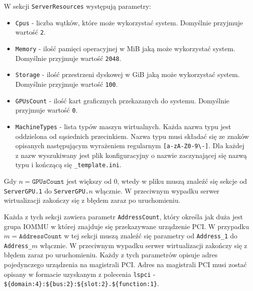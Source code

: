 \documentclass[../opis-rozwiazania.tex]{subfiles}
\begin{document}
W sekcji \texttt{ServerResources} występują parametry:
\begin{itemize}
  \item \texttt{Cpus} - liczba wątków, które może wykorzystać system. Domyślnie przyjmuje wartość \texttt{2}.
  \item \texttt{Memory} - ilość pamięci operacyjnej w MiB jaką może wykorzystać system. Domyślnie przyjmuje wartość \texttt{2048}.
  \item \texttt{Storage} - ilość przestrzeni dyskowej w GiB jaką może wykorzystać system. Domyślnie przyjmuje wartość \texttt{100}.
  \item \texttt{GPUsCount} - ilość kart graficznych przekazanych do systemu. Domyślnie przyjmuje wartość \texttt{0}.
  \item \texttt{MachineTypes} - lista typów maszyn wirtualnych. Każda nazwa typu jest oddzielona od sąsiednich przecinkiem. Nazwa typu musi składać się ze znaków opisanych następującym wyrażeniem regularnym \texttt{[a-zA-Z0-9\textbackslash-]}. Dla każdej z nazw wyszukiwany jest plik konfiguracyjny o nazwie zaczynającej się nazwą typu i kończącą się \texttt{\_template.ini}.
\end{itemize}

Gdy $n = \texttt{GPUsCount}$ jest większy od 0, wtedy w pliku muszą znaleźć się sekcje od \texttt{ServerGPU.1} do \texttt{ServerGPU.$n$} włącznie.
W przeciwnym wypadku serwer wirtualizacji zakończy się z błędem zaraz po uruchomieniu.

Każda z tych sekcji zawiera parametr \texttt{AddressCount}, który określa jak duża jest grupa IOMMU w której znajduje się przekazywane urządzenie PCI.
W przypadku $m = \texttt{AddressCount}$ w tej sekcji muszą znaleźć się parametry od \texttt{Address\_1} do \texttt{Address\_$m$} włącznie.
W przeciwnym wypadku serwer wirtualizacji zakończy się z błędem zaraz po uruchomieniu.
Każdy z tych parametrów opisuje adres pojedynczego urządzenia na magistrali PCI.
Adres na magistrali PCI musi zostać opisany w formacie uzyskanym z polecenia \texttt{lspci} - \texttt{\$\{domain:4\}:\$\{bus:2\}:\$\{slot:2\}.\$\{function:1\}}.
\end{document}
